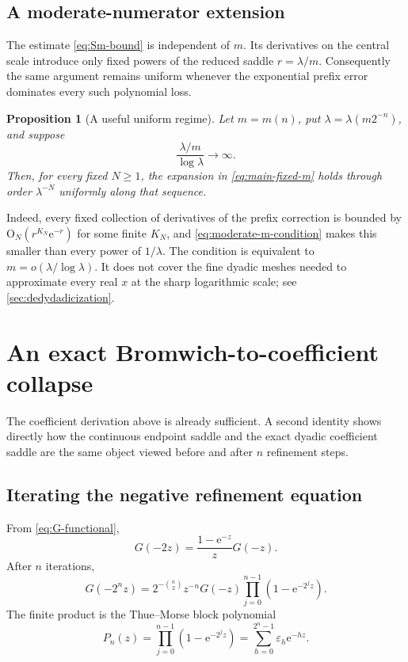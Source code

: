 \documentclass[11pt,oneside]{article}
\newtheorem{proposition}[theorem]{Proposition}
\theoremstyle{definition}
\theoremstyle{remark}
\newcommand{\e}{\mathrm e}
\newcommand{\bigO}{\mathrm O}
\newcommand{\TM}{\varepsilon}
\begin{document}
\subsection{A moderate-numerator extension}

The estimate \eqref{eq:Sm-bound} is independent of $m$.  Its derivatives on the central scale introduce only fixed powers of the reduced saddle
$r=\lambda/m$.  Consequently the same argument remains uniform whenever the exponential prefix error dominates every such polynomial loss.

\begin{proposition}[A useful uniform regime]
\label{prop:moderate-m}
Let $m=m(n)$, put $\lambda=\lambda(m2^{-n})$, and suppose
\begin{equation}
 \frac{\lambda/m}{\log\lambda}\longrightarrow\infty.
\label{eq:moderate-m-condition}
\end{equation}
Then, for every fixed $N\ge1$, the expansion in \eqref{eq:main-fixed-m} holds through order $\lambda^{-N}$ uniformly along that sequence.
\end{proposition}

Indeed, every fixed collection of derivatives of the prefix correction is bounded by
$\bigO_N(r^{K_N}\e^{-r})$ for some finite $K_N$, and \eqref{eq:moderate-m-condition} makes this smaller than every power of $1/\lambda$.  The condition is equivalent to
$m=o(\lambda/\log\lambda)$.  It does not cover the fine dyadic meshes needed to approximate every real $x$ at the sharp logarithmic scale; see
\cref{sec:dedydadicization}.

\section{An exact Bromwich-to-coefficient collapse}
\label{sec:bromwich-collapse}

The coefficient derivation above is already sufficient.  A second identity shows directly how the continuous endpoint saddle and the exact dyadic coefficient saddle are the same object viewed before and after $n$ refinement steps.

\subsection{Iterating the negative refinement equation}

From \eqref{eq:G-functional},
\begin{equation}
 G(-2z)=\frac{1-\e^{-z}}zG(-z).
\label{eq:negative-refinement}
\end{equation}
After $n$ iterations,
\begin{equation}
 G(-2^nz)=
 2^{-\binom n2}z^{-n}G(-z)
 \prod_{j=0}^{n-1}(1-\e^{-2^jz}).
\label{eq:negative-refinement-iterated}
\end{equation}
The finite product is the Thue--Morse block polynomial
\begin{equation}
 P_n(z)=\prod_{j=0}^{n-1}(1-\e^{-2^jz})
 =\sum_{h=0}^{2^n-1}\TM_h\e^{-hz}.
\label{eq:Pn-TM}
\end{equation}
\end{document}
